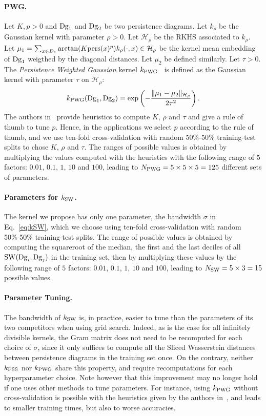 \paragraph*{PWG.} Let $K,p>0$ and $\mathrm{Dg}_1$ and $\mathrm{Dg}_2$ be two persistence diagrams.
Let $k_\rho$ be the Gaussian kernel with parameter $\rho >0$.
Let $\mathcal{H}_\rho$ be the RKHS associated to $k_\rho$.
Let $\mu_1=\sum_{x\in D_1}{\rm arctan}(K{\rm pers}(x)^p)k_\rho(\cdot,x)\in\mathcal{H}_\rho$ 
be the kernel mean embedding of $\mathrm{Dg}_1$ weigthed by the diagonal distances.
Let $\mu_2$ be defined similarly. Let $\tau >0$.
The {\em Persistence Weighted Gaussian} kernel $k_{\rm PWG}$~\cite{Kusano16, Kusano17} is
defined as the Gaussian kernel with parameter $\tau$ on $\mathcal{H}_\rho$:
$$k_{\rm PWG}(\mathrm{Dg}_1,\mathrm{Dg}_2)={\rm exp}\left(-\frac{\|\mu_1-\mu_2\|_{\mathcal{H}_\rho}}{2\tau^2}\right).$$
The authors in~\cite{Kusano16} provide heuristics to compute $K$, $\rho$ and $\tau$
and give a rule of thumb to tune $p$. Hence, in the applications we select $p$ according to the rule of thumb, and
 we use ten-fold cross-validation with random 50\%-50\% training-test splits to chose $K$, $\rho$ and $\tau$. 
The ranges of possible values is obtained 
by multiplying the values computed with the heuristics
with the following range of $5$ factors: $0.01$, $0.1$, $1$, $10$ and $100$,
leading to $N_{\rm PWG}=5\times 5\times 5=125$ different sets of parameters.

\paragraph*{Parameters for $k_{\rm SW}$.} The kernel we propose has only one parameter, the bandwidth $\sigma$ in Eq.~\ref{eq:kSW}, 
which we choose
using ten-fold cross-validation with random 50\%-50\% training-test splits. 
The range of possible values is obtained by computing the squareroot of the median, the first and the last deciles 
of all ${\rm SW}(\mathrm{Dg}_i,\mathrm{Dg}_j)$ in the training set,
then by multiplying these values by the following range of $5$ factors: $0.01$, $0.1$, $1$, $10$ and $100$, 
leading to $N_{\rm SW}=5\times 3= 15$ possible values. 


\paragraph*{Parameter Tuning.} The bandwidth of $k_{\rm SW}$ is, in practice, easier to tune than the parameters of its two competitors
when using grid search. Indeed, as is the case for all infinitely divisible kernels, the Gram matrix does not need to be 
recomputed for each choice of $\sigma$, since it only suffices to compute all the Sliced Wasserstein distances between persistence diagrams
in the training set once. On the contrary, neither $k_{\rm PSS}$ nor $k_{\rm PWG}$ share this property, and require recomputations for each hyperparameter choice.
Note however that this improvement may no longer hold if one uses other methods to tune parameters.  
For instance, using $k_{\rm PWG}$ without cross-validation is possible with the heuristics given by the authors in~\cite{Kusano16}, 
and leads to smaller training times, but also to worse accuracies. 



